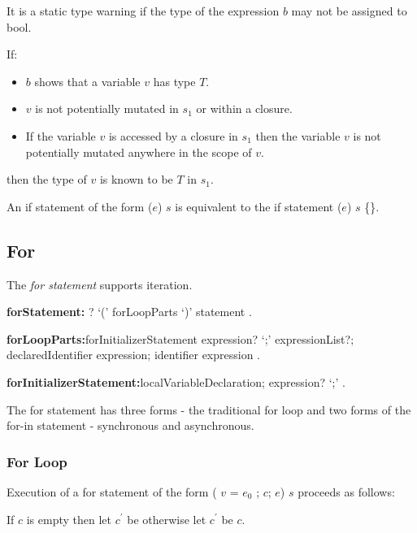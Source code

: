 \documentclass{article}
\newcommand{\code}[1]{{\sf #1}}
\begin{document}
\LMHash{}
It is a static type warning if the type of the expression $b$ may not be assigned to \code{bool}.

\LMHash{}
If:
\begin{itemize}
\item $b$ shows that a variable $v$ has type $T$.
\item $v$ is not potentially mutated in $s_1$ or within a closure.
\item If the variable $v$ is accessed by a closure in $s_1$ then the variable $v$ is not potentially mutated anywhere in the scope of $v$.
\end{itemize}
then the type of $v$ is known to be $T$ in $s_1$.

\LMHash{}
An if statement of the form \code{\IF{} ($e$) $s$} is equivalent to the if statement \code{\IF{} ($e$) $s$ \ELSE{} \{\}}.


\subsection{For}

\LMHash{}
The {\em for statement} supports iteration.

\begin{grammar}
{\bf forStatement:}
     \AWAIT? \FOR{} `(' forLoopParts `)' statement
    .

{\bf forLoopParts:}forInitializerStatement expression? `{\escapegrammar ;}' expressionList?;
      declaredIdentifier \IN{} expression;
      identifier \IN{} expression
    .

{\bf forInitializerStatement:}localVariableDeclaration;
      expression? `{\escapegrammar ;}'
    .
 \end{grammar}

\LMHash{}
 The for statement has three forms - the traditional for loop and two forms of the for-in statement - synchronous and asynchronous.

\subsubsection{For Loop}


\LMHash{}
Execution of a for statement of the form \code{ \FOR{} (\VAR{} $v$ = $e_0$ ; $c$; $e$) $s$} proceeds as follows:

\LMHash{}
If $c$ is empty then let $c^\prime$ be \TRUE{} otherwise let  $c^\prime$ be $c$.
\end{document}
